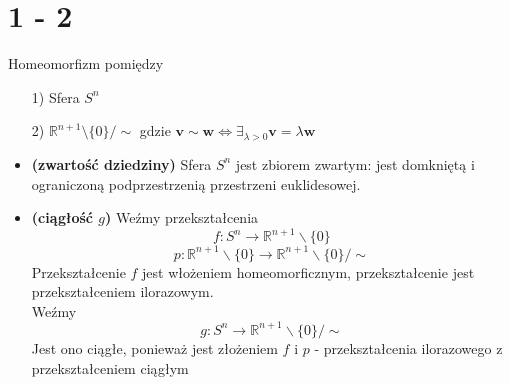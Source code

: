 \newpage
\section*{1 - 2}
Homeomorfizm pomiędzy
\begin{itemize}
  \item[1)] Sfera $S^n$
  \item[2)] $\mathbb{R} ^ {n+1} \setminus \{ 0 \} / \sim $ gdzie $ \mathbf{v} \sim  \mathbf{w} \iff \exists_{\lambda > 0}  \mathbf{v}=  \lambda \mathbf{w} $
\end{itemize}
\begin{itemize}

\item \textbf{(zwartość dziedziny)} Sfera $ S^n $ jest zbiorem zwartym: jest domkniętą i ograniczoną podprzestrzenią przestrzeni euklidesowej.\\

\item \textbf{(ciągłość $g$)} Weźmy przekształcenia
$$
f: S^n \rightarrow \mathbb{R}^{n+1} \backslash \{0\}
$$
$$
p: \mathbb{R}^{n+1} \backslash \{0\} \rightarrow \mathbb{R}^{n+1} \backslash \{0\} / \sim
$$
Przekształcenie $f$ jest włożeniem homeomorficznym, przekształcenie jest przekształceniem ilorazowym.
\\
Weźmy
$$ g: S^n \rightarrow \mathbb{R}^{n+1} \backslash \{0\} / \sim $$
Jest ono ciągłe, ponieważ jest złożeniem $f$ i $p$ - przekształcenia ilorazowego z przekształceniem ciągłym\\
\end{itemize}


